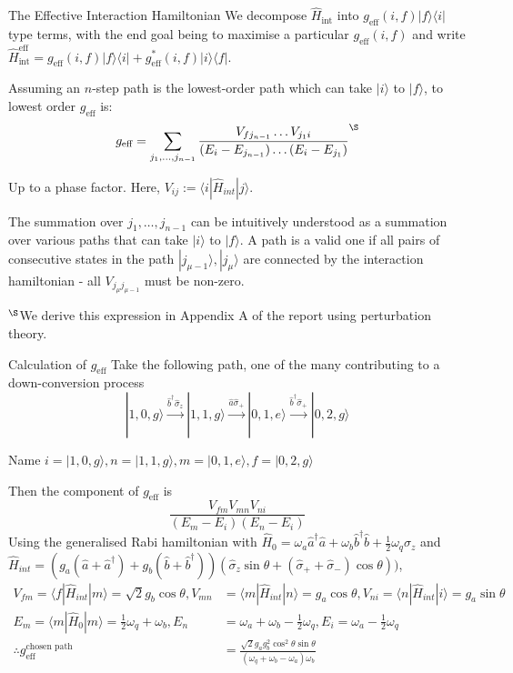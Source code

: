 \documentclass[pdf,9pt]{beamer}
\begin{document}
    \begin{frame}{The Effective Interaction Hamiltonian}
    We decompose $\hat H_\text{int}$ into $g_\text{eff}(i,f) |f\rangle \langle i|$ type terms, with the end goal being to maximise a particular $g_\text{eff}(i,f)$ and write $\hat H_\text{int}^\text{eff} = g_\text{eff}(i,f) |f\rangle \langle i| + g^*_\text{eff}(i,f) |i\rangle \langle f|$.

Assuming an $n$-step path is the lowest-order path which can take $|i\rangle$ to $|f\rangle$, to lowest order $g_\text{eff}$ is:
$$
g_\text{eff} = \sum_{j_1,\dots,j_{n-1}}\frac{V_{fj_{n-1}}\dots V_{j_1i}}{(E_i-E_{j_{n-1}})\dots(E_{i}-E_{j_1})}^\S
$$

Up to a phase factor. Here, $V_{ij} := \langle i|\hat H_{int}|j\rangle$.


The summation over ${j_1,\dots,j_{n-1}}$ can be intuitively understood as a summation over various paths that can take $|i\rangle$ to $|f\rangle$. A path is a valid one if all pairs of consecutive states in the path $|j_{\mu-1}\rangle,|j_\mu\rangle$ are connected by the interaction hamiltonian - all $V_{j_\mu j_{\mu-1}}$ must be non-zero.

\hfill\newline
$^\S$We derive this expression in Appendix A of the report using perturbation theory.
    \end{frame}

\begin{frame}{Calculation of $g_\text{eff}$}
Take the following path, one of the many contributing to a down-conversion process
$$
|1,0,g\rangle\xrightarrow{\hat b^\dagger\hat\sigma_z}|1,1,g\rangle\xrightarrow{\hat a \hat\sigma_+}|0,1,e\rangle\xrightarrow{\hat b^\dagger\hat\sigma_+}|0,2,g\rangle
$$

Name $i=|1,0,g\rangle, n = |1,1,g\rangle, m=|0,1,e\rangle, f = |0,2,g\rangle $

Then the component of $g_\text{eff}$ is
$$
\frac{V_{fm}V_{mn}V_{ni}}{(E_m-E_i)(E_n-E_i)}
$$%
Using the generalised Rabi hamiltonian with $\hat H_0 = \omega_a \hat a^\dagger\hat a+\omega_b\hat b^\dagger\hat b + \frac 1 2 \omega_q\hat\sigma_z$
and $\hat H_{int} = (g_a(\hat a+\hat a^\dagger)+g_b(\hat b+\hat b^\dagger))(\hat\sigma_z\sin\theta+(\hat\sigma_++\hat\sigma_-)\cos\theta))$,
\begin{align*}
V_{fm} = \langle f|\hat H_{int}| m\rangle = \sqrt{2}g_b\cos\theta, 
V_{mn} &= \langle m|\hat H_{int}| n\rangle = g_a\cos\theta, 
V_{ni} = \langle n|\hat H_{int}| i\rangle = g_a\sin\theta
\\
E_m =  \langle m|\hat H_{0}| m\rangle = \frac 1 2\omega_q+\omega_b, 
E_n &= \omega_a + \omega_b - \frac 1 2 \omega_q,
E_i = \omega_a - \frac 1 2 \omega_q
\\[0.5ex]
\therefore g_\text{eff}^\text{chosen path} &= \frac{\sqrt{2}g_a g_b^2 \cos^2\theta\sin\theta}{(\omega_q+\omega_b-\omega_a)\omega_b}
\end{align*}
    
\end{frame}
\end{document}
